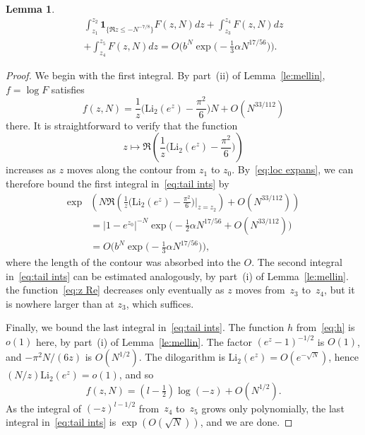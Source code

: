 \documentclass[a4paper]{amsart}
\newtheorem{lemma}[theorem]{Lemma}
\begin{document}
\begin{lemma}\label{le:tail}
  \begin{multline}\label{eq:tail ints}
     \int_{z_1}^{z_2} \mathbf{1}_{\{\Re z \leq -N^{-7/8}\}}F(z,N) dz
     + \int_{z_3}^{z_4}F(z,N) dz \\
+ \int_{z_4}^{z_5}F(z,N)dz = O\Big(b^N \exp\Big( -\tfrac13 \alpha N^{17/56} \Big)\Big).
  \end{multline}
\end{lemma}
\begin{proof}
  We begin with the first integral. By part~(ii)
  of Lemma~\ref{le:mellin}, $f=\log F$ satisfies
  \[
    f(z,N) = \frac{1}{z}\Big( \mathrm{Li}_2(e^z) - \frac{\pi^2}{6}\Big)N
      + O(N^{33/112})
  \]
  there. It is straightforward to verify that the function
  \begin{equation}\label{eq:z Re}
   z\mapsto \Re\left(
  \frac{1}{z}\Big( \mathrm{Li}_2(e^z) - \frac{\pi^2}{6}\Big)\right)
  \end{equation}
  increases as $z$ moves along the contour from $z_1$ to $z_0$.
  By~\eqref{eq:loc expans}, we can therefore bound the first integral in~\eqref{eq:tail ints} by 
  \begin{align*}
    \exp &\left(    N \Re \left(     \frac{1}{z}
    \Big(     \mathrm{Li}_2(e^z) - \frac{\pi^2}{6}  \Big)
    \Big|_{z=z_2}
    \right) 
    + O(N^{33/112})  \right)    \\
    &= |1-e^{z_0}|^{-N} \exp\Big( -\tfrac12 \alpha N^{17/56} + O(N^{33/112})\Big) \\
    &=   O\Big(b^N \exp\Big( -\tfrac13 \alpha N^{17/56} \Big)\Big),
  \end{align*}
  where the length of the contour was absorbed into the $O$.
  The second integral in~\eqref{eq:tail ints} can be estimated analogously,
   by part~(i) of Lemma~\ref{le:mellin}.
  the function~\eqref{eq:z Re} decreases only eventually as $z$ moves
  from~$z_3$ to~$z_4$, but it is nowhere larger than at $z_3$, which suffices.

  Finally, we bound the last integral in~\eqref{eq:tail ints}. The function
  $h$ from~\eqref{eq:h} is $o(1)$ here, by part~(i) of Lemma~\ref{le:mellin}. 
  The factor $(e^z-1)^{-1/2}$ is $O(1)$, and $-\pi^2N/(6z)$ is
  $O(N^{1/2})$. The dilogarithm is $\mathrm{Li}_2(e^z) = O(e^{-\sqrt{N}})$,
  hence $(N/z)\mathrm{Li}_2(e^z) =  o(1)$,  and so
  \[
     f(z,N) = (l-\tfrac12)\log(-z) +O(N^{1/2}).
  \]
  As the integral of $(-z)^{l-1/2}$ from~$z_4$ to~$z_5$ grows only
  polynomially, the last integral in~\eqref{eq:tail ints}
  is $\exp(O(\sqrt{N}))$, and we are done.
\end{proof}
\end{document}
